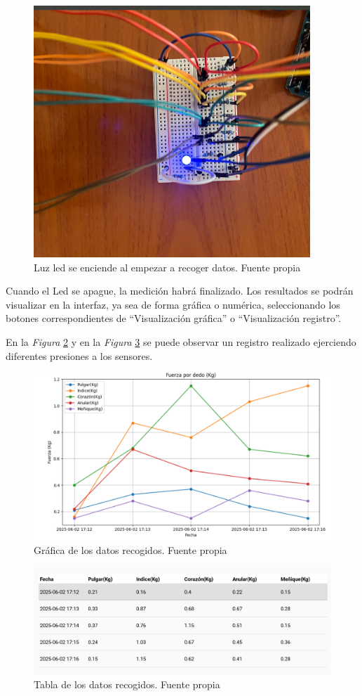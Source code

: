 \begin{figure}
    \centering
    \includegraphics[angle=90 ,width=0.5\linewidth]{img/Luz_encendido.png}
    \caption{Luz led se enciende al empezar a recoger datos. Fuente propia}
    \label{fig:luz}
\end{figure}

Cuando el Led se apague, la medición habrá finalizado. Los resultados se podrán visualizar en la interfaz, ya sea de forma gráfica o numérica, seleccionando los botones correspondientes de “Visualización gráfica” o “Visualización registro”.

En la \textit{Figura} \ref{fig:Grafico} y en la \textit{Figura} \ref{fig:registro} se puede observar un registro realizado ejerciendo diferentes presiones a los sensores. 
\begin{figure}
    \centering
    \includegraphics[width=1\linewidth]{img/grafica_fuerza.png}
    \caption{Gráfica de los datos recogidos. Fuente propia}
    \label{fig:Grafico}
\end{figure}

\begin{figure}
    \centering
    \includegraphics[width=1\linewidth]{img/Datos_medidas.png}
    \caption{Tabla de los datos recogidos. Fuente propia}
    \label{fig:registro}
\end{figure}